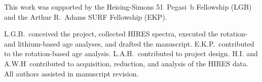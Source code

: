 \documentclass[11pt,twocolumn,tighten]{aastex63}
\begin{document}
\acknowledgements
This work was supported by the 
Heising-Simons 51~Pegasi~b Fellowship (LGB)
and the Arthur R.~Adams SURF Fellowship (EKP).

L.G.B.~conceived the project, collected HIRES spectra, executed the
rotation- and lithium-based age analyses, and drafted the manuscript.
E.K.P.~contributed to the rotation-based age analysis.
L.A.H.~contributed to project design.
H.I. and A.W.H~contributed to acquisition, reduction, and analysis of
the HIRES data.
All authors assisted in manuscript revision.









\clearpage
\listofchanges
\end{document}
